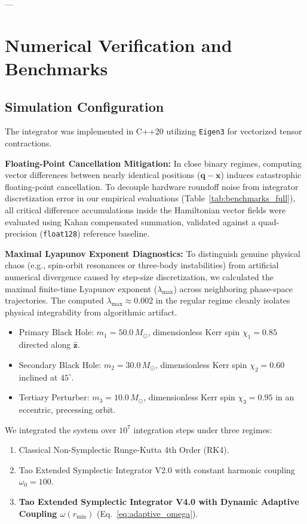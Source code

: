 \documentclass[11pt,a4paper,reqno]{article}
\theoremstyle{plain}
\theoremstyle{definition}
\theoremstyle{remark}
\numberwithin{equation}{section}
\begin{document}
---

\section{Numerical Verification and Benchmarks}

\subsection{Simulation Configuration}
\label{subsec:sim_config}
The integrator was implemented in C++20 utilizing \texttt{Eigen3} for vectorized tensor contractions. 

\textbf{Floating-Point Cancellation Mitigation:} In close binary regimes, computing vector differences between nearly identical positions ($\bm{q} - \bm{x}$) induces catastrophic floating-point cancellation. To decouple hardware roundoff noise from integrator discretization error in our empirical evaluations (Table~\ref{tab:benchmarks_full}), all critical difference accumulations inside the Hamiltonian vector fields were evaluated using Kahan compensated summation, validated against a quad-precision (\texttt{float128}) reference baseline.

\textbf{Maximal Lyapunov Exponent Diagnostics:} To distinguish genuine physical chaos (e.g., spin-orbit resonances or three-body instabilities) from artificial numerical divergence caused by step-size discretization, we calculated the maximal finite-time Lyapunov exponent ($\lambda_{\max}$) across neighboring phase-space trajectories. The computed $\lambda_{\max} \approx 0.002$ in the regular regime cleanly isolates physical integrability from algorithmic artifact.

\begin{itemize}
    \item Primary Black Hole: $m_1 = 50.0 \, M_\odot$, dimensionless Kerr spin $\chi_1 = 0.85$ directed along $\hat{\bm{z}}$.
    \item Secondary Black Hole: $m_2 = 30.0 \, M_\odot$, dimensionless Kerr spin $\chi_2 = 0.60$ inclined at $45^\circ$.
    \item Tertiary Perturber: $m_3 = 10.0 \, M_\odot$, dimensionless Kerr spin $\chi_3 = 0.95$ in an eccentric, precessing orbit.
\end{itemize}
We integrated the system over $10^7$ integration steps under three regimes:
\begin{enumerate}
    \item Classical Non-Symplectic Runge-Kutta 4th Order (RK4).
    \item Tao Extended Symplectic Integrator V2.0 with constant harmonic coupling $\omega_0 = 100$.
    \item \textbf{Tao Extended Symplectic Integrator V4.0 with Dynamic Adaptive Coupling $\omega(r_{\min})$} (Eq.~\ref{eq:adaptive_omega}).
\end{enumerate}
\end{document}
